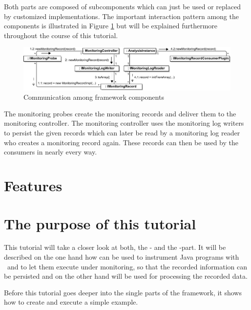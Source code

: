 \noindent Both parts are composed of subcomponents which can just be used or %
replaced by customized implementations. The important interaction pattern among %
the components is illustrated in Figure \ref{Figure:KiekerCommunicationDiagram} %
but will be explained furthermore throughout the course of this tutorial. %

\begin{figure}[H]\centering
\includegraphics[width=1\textwidth]{images/kiekerCommunications-revisedReArranged-woMonitoringLog-bw-newNames}
\caption{Communication among \Kieker{} framework components}
\label{Figure:KiekerCommunicationDiagram}
\end{figure}
		
\noindent\notify The monitoring probes create the monitoring records and deliver %
them to the monitoring controller. The monitoring controller uses the monitoring %
log writers to persist the given records which can later be read by a monitoring %
log reader who creates a monitoring record again. These records can then be used %
by the consumers in nearly every way.

\section{Features}
	
\section{The purpose of this tutorial}
This tutorial will take a closer look at both, the \KiekerMonitoringPart{}- and %
the \KiekerAnalysisPart-part. It will be described on the one hand how %
\KiekerMonitoringPart{}  can be used to instrument Java programs %
with \Kieker\ and to let them execute under monitoring, so that the recorded %
information can be persisted and on the other hand \KiekerAnalysisPart{} %
will be used for processing the recorded data.

Before this tutorial goes deeper into the single parts of the framework, it %
shows how to create and execute a simple example.